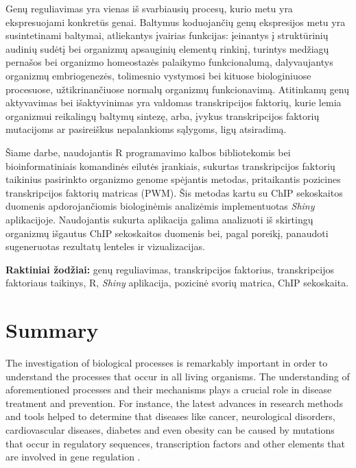 \documentclass[12pt]{article}
\begin{document}
Genų reguliavimas yra vienas iš svarbiausių procesų, kurio metu yra
ekspresuojami konkretūs genai. Baltymus koduojančių genų ekspresijos metu yra
susintetinami baltymai, atliekantys įvairias funkcijas: įeinantys į struktūrinių
audinių sudėtį bei organizmų apsauginių elementų rinkinį, turintys medžiagų
pernašos bei organizmo homeostazės palaikymo funkcionalumą, dalyvaujantys
organizmų embriogenezės, tolimesnio vystymosi bei kituose biologiniuose
procesuose, užtikrinančiuose normalų organizmų funkcionavimą. Atitinkamų genų
aktyvavimas bei išaktyvinimas yra valdomas transkripcijos faktorių, kurie lemia
organizmui reikalingų baltymų sintezę, arba, įvykus transkripcijos faktorių
mutacijoms ar pasireiškus nepalankioms sąlygoms, ligų atsiradimą.

Šiame darbe, naudojantis R programavimo kalbos bibliotekomis bei
bioinformatiniais komandinės eilutės įrankiais, sukurtas transkripcijos faktorių
taikinius pasirinkto organizmo genome spėjantis metodas, pritaikantis pozicines
transkripcijos faktorių matricas (PWM). Šis metodas kartu su ChIP sekoskaitos
duomenis apdorojančiomis biologinėmis analizėmis implementuotas \emph{Shiny}
aplikacijoje. Naudojantis sukurta aplikacija galima analizuoti iš skirtingų
organizmų išgautus ChIP sekoskaitos duomenis bei, pagal poreikį, panaudoti
sugeneruotas rezultatų lenteles ir vizualizacijas.

\hfill \break
\textbf{Raktiniai žodžiai:} genų reguliavimas, transkripcijos faktorius, 
transkripcijos faktoriaus taikinys, R, \emph{Shiny} aplikacija, pozicinė svorių
matrica, ChIP sekoskaita.

\newpage


\section*{Summary}
The investigation of biological processes is remarkably important in order to
understand the processes that occur in all living organisms. The understanding
of aforementioned processes and their mechanisms plays a crucial role in
disease treatment and prevention. For instance, the latest advances in research
methods and tools helped to determine that diseases like cancer, neurological
disorders, cardiovascular diseases, diabetes and even obesity can be caused
by mutations that occur in regulatory sequences, transcription factors and
other elements that are involved in gene regulation  \cite{ARTICLE0}.
\end{document}
